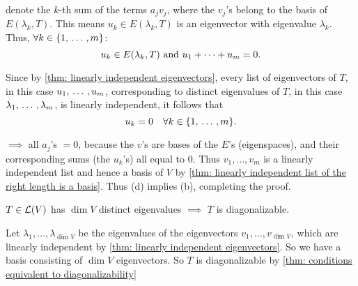 \begin{prf}
  denote the $k$-th sum of the terms $a_jv_j$, where the $v_j$'s belong to the basis of $E(\lambda_k, T)$. This means $u_k \in E(\lambda_k, T)$ is an eigenvector with eigenvalue $\lambda_k$.
  Thus, $\forall k \in \{1, {\, \ldots \,\,}, m \}$:
  \begin{equation}
    u_k \in E(\lambda_k, T)$ and $u_1 + \cdots + u_m = 0.
  \end{equation}

  Since by \ref{thm: linearly independent eigenvectors},
  every list of eigenvectors of $T$, in this case $u_1, {\, \ldots \,\,}, u_m$, corresponding to distinct eigenvalues of $T$, in this case $\lambda_1, {\, \ldots \,\,}, \lambda_m$, is linearly independent, it follows that
  \begin{equation}
    u_k = 0 \quad \forall k \in \{1, {\, \ldots \,\,}, m \}.
  \end{equation}

  $\implies$ all $a_j$'s $=0$, because the $v$'s are bases of the $E$'s  (eigenspaces), and their corresponding sums (the $u_k$'s) all equal to $0$. Thus $v_1, \ldots, v_m$ is a linearly independent list and hence a basis of $V$ by \ref{thm: linearly independent list of the right length is a basis}. Thus (d) implies (b), completing the proof.
\end{prf}

\setcounter{thm}{57}
\begin{thm} 
  \label{thm: enough eigenvalues implies diagonalizability}
  $T\in \mathcal{L}(V)$ has $\dim V$ distinct eigenvalues
    $\implies$ $T$ is diagonalizable.
\end{thm}
\begin{prf}
  Let $\lambda_1, \ldots, \lambda_{\dim V}$ be the eigenvalues of the eigenvectors $v_1, \ldots, v_{\dim V}$, which are linearly independent by \autoref{thm: linearly independent eigenvectors}. So we have a basis consisting of $\dim V$ eigenvectors. So $T$ is diagonalizable by \ref{thm: conditions equivalent to diagonalizability}
\end{prf}

